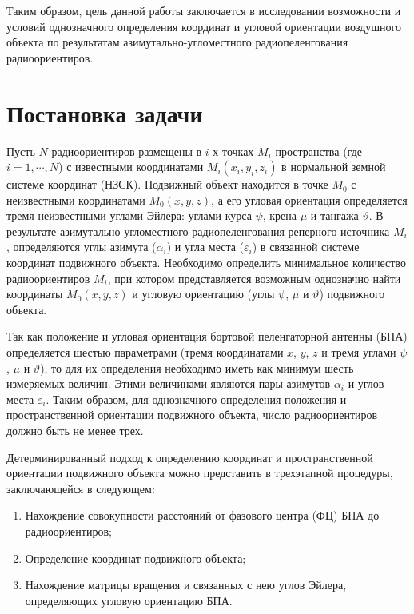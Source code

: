 \documentclass[a4paper,12pt]{article}
\begin{document}
Таким образом, цель данной работы заключается в исследовании возможности и условий однозначного определения
координат и угловой ориентации воздушного объекта по результатам азимутально-угломестного радиопеленгования
радиоориентиров.

\section{Постановка задачи}
Пусть $N$ радиоориентиров размещены в $i$-х точках $M_i$ пространства (где $i = 1, \cdots, N$) с известными
координатами $M_i\left(x_i, y_i, z_i\right)$ в нормальной земной системе координат (НЗСК). Подвижный объект
находится в точке $M_0$ с неизвестными координатами $M_0\left(x, y, z\right)$, а его угловая ориентация
определяется тремя неизвестными углами Эйлера: углами курса $\psi$, крена $\mu$ и тангажа $\vartheta$.
В результате азимутально-угломестного радиопеленгования реперного источника $M_i$, определяются углы
азимута ($\alpha_i$) и угла места ($\varepsilon_i$) в связанной системе координат подвижного объекта. Необходимо
определить минимальное количество радиоориентиров $M_i$, при котором представляется возможным однозначно найти
координаты $M_0\left(x, y, z\right)$ и угловую ориентацию (углы $\psi$, $\mu$ и $\vartheta$) подвижного
объекта.

Так как положение и угловая ориентация бортовой пеленгаторной антенны (БПА) определяется шестью параметрами
(тремя координатами $x$, $y$, $z$ и тремя углами $\psi$, $\mu$ и $\vartheta$), то для их определения необходимо
иметь как минимум шесть измеряемых величин. Этими величинами являются пары азимутов $\alpha_i$ и углов места
$\varepsilon_i$. Таким образом, для однозначного определения положения и пространственной ориентации подвижного
объекта, число радиоориентиров должно быть не менее трех.

Детерминированный подход к определению координат и пространственной ориентации подвижного объекта можно представить
в трехэтапной процедуры, заключающейся в следующем:
\begin{enumerate}
    \item Нахождение совокупности расстояний от фазового центра (ФЦ) БПА до радиоориентиров;
    \item Определение координат подвижного объекта;
    \item Нахождение матрицы вращения и связанных с нею углов Эйлера, определяющих угловую ориентацию БПА.
\end{enumerate}
\end{document}
